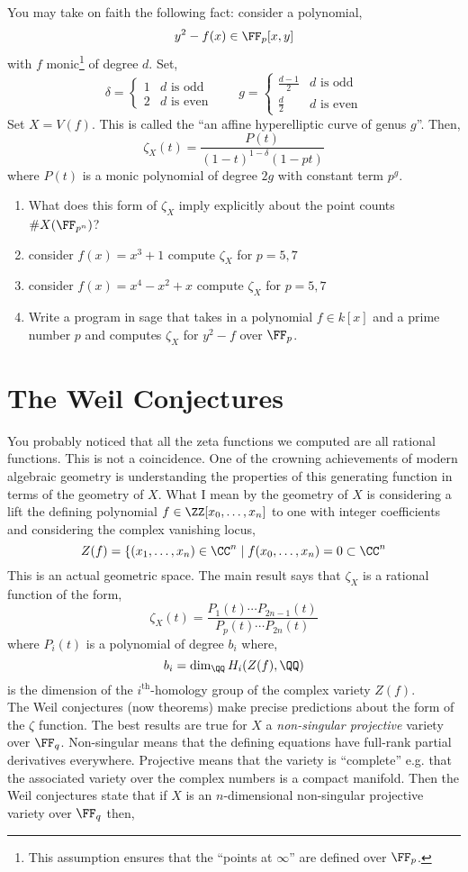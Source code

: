 \documentclass[12pt]{article}
\begin{document}
You may take on faith the following fact: consider a polynomial,
\[ y^2 - f(x) \in \FF_p[x,y] \]
with $f$ monic\footnote{This assumption ensures that the ``points at $\infty$'' are defined over $\FF_p$.} of degree $d$. Set,
\[ \delta = 
\begin{cases}
1 & d \text{ is odd}
\\
2 & d \text{ is even}
\end{cases} 
\quad \quad
g = 
\begin{cases}
\frac{d-1}{2} & d \text{ is odd}
\\
\frac{d}{2} & d \text{ is even}
\end{cases} \]
Set $X = V(f)$. This is called the ``an affine hyperelliptic curve of genus $g$''. Then,
\[ \zeta_{X}(t) = \frac{P(t)}{(1 - t)^{1-\delta} (1 - p t)} \]
where $P(t)$ is a monic polynomial of degree $2g$ with constant term $p^g$. 
\begin{enumerate}
\item What does this form of $\zeta_{X}$ imply explicitly about the point counts $\# X(\FF_{p^n})$?
\item consider $f(x) = x^3 + 1$ compute $\zeta_X$ for $p = 5,7$
\item consider $f(x) = x^4 - x^2 + x$ compute $\zeta_X$ for $p = 5,7$
\item Write a program in sage that takes in a polynomial $f \in k[x]$ and a prime number $p$ and computes $\zeta_X$ for $y^2 - f$ over $\FF_p$.
\end{enumerate}


\section{The Weil Conjectures}

You probably noticed that all the zeta functions we computed are all rational functions. This is not a coincidence. One of the crowning achievements of modern algebraic geometry is understanding the properties of this generating function in terms of the geometry of $X$. What I mean by the geometry of $X$ is considering a lift the defining polynomial $f \in \ZZ[x_0, \dots, x_n]$ to one with integer coefficients and considering the complex vanishing locus,
\[ Z(f) = \{ (x_1, \dots, x_n) \in \CC^{n} \mid f(x_0, \dots, x_n) = 0 \subset \CC^{n} \]
This is an actual geometric space. The main result says that $\zeta_X$ is a rational function of the form,
\[ \zeta_X(t) = \frac{P_1(t) \cdots P_{2n-1}(t)}{P_p(t) \cdots P_{2n}(t)} \]
where $P_i(t)$ is a polynomial of degree $b_i$ where,
\[ b_i = \dim_{\QQ} H_i(Z(f), \QQ) \]
is the dimension of the $i^{\text{th}}$-homology group of the complex variety $Z(f)$.
\\
The Weil conjectures \cite{weil} (now theorems) make precise predictions about the form of the $\zeta$ function. The best results are true for $X$ a \textit{non-singular projective} variety over $\FF_q$. Non-singular means that the defining equations have full-rank partial derivatives everywhere. Projective means that the variety is ``complete'' e.g. that the associated variety over the complex numbers is a compact manifold. Then the Weil conjectures state that if $X$ is an $n$-dimensional non-singular projective variety over $\FF_q$ then,
\end{document}
